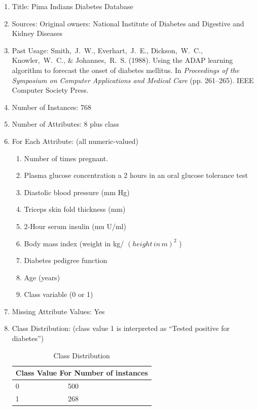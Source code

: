 \documentclass[a4paper,14pt,onecolumn]{article}
\begin{document}
\begin{enumerate}
\item Title: Pima Indians Diabetes Database
\item Sources:
                    Original owners: National Institute of Diabetes and Digestive and
                     Kidney Diseases
\item Past Usage:
 Smith,~J.~W., Everhart,~J.~E., Dickson,~W.~C., Knowler,~W.~C., \&    	            Johannes,~R.~S. (1988). Using the ADAP learning algorithm to forecast
the onset of diabetes mellitus.  In {\it Proceedings of the Symposium   	                               on Computer Applications and Medical Care} (pp. 261--265).  IEEE
                        Computer Society Press.
\item Number of Instances: 768
\item Number of Attributes: 8 plus class 
\item For Each Attribute: (all numeric-valued)
  \begin{enumerate}
  \item Number of times pregnant.
  \item Plasma glucose concentration a 2 hours in an oral glucose tolerance test
  \item Diastolic blood pressure (mm Hg)
  \item Triceps skin fold thickness (mm)
  \item 2-Hour serum insulin (mu U/ml)
  \item Body mass index (weight in kg/  \begin{math}  (height\,in\,m)^{2} \end{math}  )
  \item Diabetes pedigree function
  \item Age (years)
  \item Class variable (0 or 1)
  \end{enumerate}
\item Missing Attribute Values: Yes
\item Class Distribution: (class value 1 is interpreted as ``Tested positive for
   	     diabetes'')
           
    \begin{table}[hbp]
       \begin{center}
            \begin{tabular}{|l|l|}
                     \hline
 					 \multicolumn{2}{|c|}{  Class Value For Number of instances} \\
 					 \hline
 						 0 & 500 \\
 						 1 & 268 \\
                     \hline
           \end{tabular}
        \end{center}
     \caption{Class Distribution}
     \end{table}


\end{enumerate}
\end{document}
